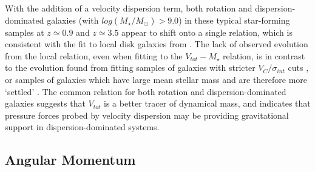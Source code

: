 \documentclass[fleqn,usenatbib]{mnras}
\begin{document}
With the addition of a velocity dispersion term, both rotation and dispersion-dominated galaxies (with $log(M_{\star}/M_{\odot}) > 9.0$) in these typical star-forming samples at $z\simeq0.9$ and $z\simeq3.5$ appear to shift onto a single relation, which is consistent with the fit to local disk galaxies from \cite{Reyes2011}.
The lack of observed evolution from the local relation, even when fitting to the $V_{tot}-M_{\star}$ relation, is in contrast to the evolution found from fitting samples of galaxies with stricter $V_{C}/\sigma_{int}$ cuts \citep{Cresci2009,Tiley2016,Straatman2017}, or samples of galaxies which have large mean stellar mass and are therefore more `settled' \citep{Ubler2017}.
The common relation for both rotation and dispersion-dominated galaxies suggests that $V_{tot}$ is a better tracer of dynamical mass, and indicates that pressure forces probed by velocity dispersion may be providing gravitational support in dispersion-dominated systems. 

\subsection{Angular Momentum}\label{subsec:ang_mom}
\end{document}
